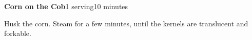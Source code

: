 \documentclass[../Cookbook.tex]{subfiles}
\begin{document}
\begin{recipe}[Corn]{\textbf{Corn on the Cob}}{1 serving}{10 minutes}

  Husk the corn.
  Steam for a few minutes, until the kernels are translucent and forkable.

\end{recipe}
\end{document}
